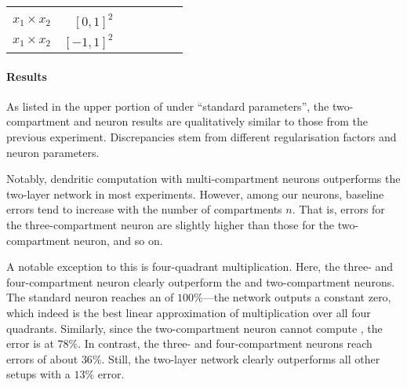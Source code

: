 \begin{table}
\begin{tabular}{r r r r r r r }
& \cellcolor{White!80!SteelBlue}{$5.0 \pm 0.4 \%$}
& \cellcolor{White!40!SteelBlue}{$23.1 \pm 1.2 \%$}
& \cellcolor{White!20!SteelBlue}{$25.3 \pm 1.2 \%$}
\\
$x_1 \times x_2$
& $[0, 1]^2$
& \cellcolor{White!20!SteelBlue}{$23.4 \pm 1.0 \%$}
& \cellcolor{White!80!SteelBlue}{$10.2 \pm 0.7 \%$}
& \cellcolor{White!100!SteelBlue}{$\mathbf{5.4 \pm 0.6 \%}$}
& \cellcolor{White!60!SteelBlue}{$11.0 \pm 0.7 \%$}
& \cellcolor{White!40!SteelBlue}{$11.3 \pm 0.9 \%$}
\\
$x_1 \times x_2$
& $[-1, 1]^2$
& \cellcolor{White!20!SteelBlue}{$103.4 \pm 2.1 \%$}
& \cellcolor{White!100!SteelBlue}{$\mathbf{11.4 \pm 1.5 \%}$}
& \cellcolor{White!40!SteelBlue}{$71.3 \pm 4.8 \%$}
& \cellcolor{White!60!SteelBlue}{$20.0 \pm 5.3 \%$}
& \cellcolor{White!80!SteelBlue}{$18.1 \pm 4.1 \%$}
\\
\bottomrule
\end{tabular}
\end{table}

\paragraph{Results}
As listed in the upper portion of  under \enquote{standard parameters}, the two-compartment and \LIF neuron results are qualitatively similar to those from the previous experiment.
Discrepancies stem from different regularisation factors and neuron parameters.

Notably, dendritic computation with multi-compartment neurons outperforms the two-layer network in most experiments.
However, among our \nlif neurons, baseline errors tend to increase with the number of compartments $n$.
That is, errors for the three-compartment neuron are slightly higher than those for the two-compartment neuron, and so on.

A notable exception to this is four-quadrant multiplication.
Here, the three- and four-compartment neuron clearly outperform the \LIF and two-compartment \LIF neurons.
The standard \LIF neuron reaches an \NRMSE of $100\%$---the network outputs a constant zero, which indeed is the best linear approximation of multiplication over all four quadrants.
Similarly, since the two-compartment \LIF neuron cannot compute \XOR, the error is at $78\%$.
In contrast, the three- and four-compartment neurons reach errors of about $36\%$.
Still, the two-layer network clearly outperforms all other setups with a $13\%$ error.

